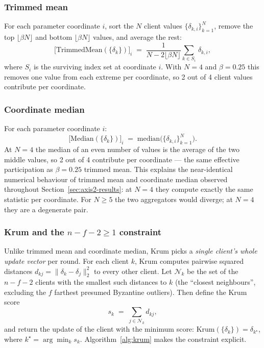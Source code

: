\documentclass[preprint,12pt,authoryear]{elsarticle}
\begin{document}
\subsubsection{Trimmed mean}
\label{subsec:trimmed}

For each parameter coordinate $i$, sort the $N$ client values
$\{\delta_{k,i}\}_{k=1}^N$, remove the top
$\lfloor \beta N \rfloor$ and bottom $\lfloor \beta N \rfloor$
values, and average the rest:
\begin{equation}
    \bigl[\mathrm{TrimmedMean}(\{\delta_k\})\bigr]_i
    \;=\; \frac{1}{N - 2\lfloor \beta N \rfloor}
    \sum_{k \in S_i}\, \delta_{k,i},
    \label{eq:trimmed}
\end{equation}
where $S_i$ is the surviving index set at coordinate $i$. With
$N = 4$ and $\beta = 0.25$ this removes one value from each extreme
per coordinate, so 2 out of 4 client values contribute per
coordinate.

\subsubsection{Coordinate median}
\label{subsec:median}

For each parameter coordinate $i$:
\begin{equation}
    \bigl[\mathrm{Median}(\{\delta_k\})\bigr]_i
    \;=\; \mathrm{median}\bigl(\{\delta_{k,i}\}_{k=1}^N\bigr).
    \label{eq:median}
\end{equation}
At $N = 4$ the median of an even number of values is the average of
the two middle values, so 2 out of 4 contribute per coordinate ---
the same effective participation as $\beta = 0.25$ trimmed mean.
This explains the near-identical numerical behaviour of trimmed
mean and coordinate median observed throughout
Section~\ref{sec:axis2-results}: at $N = 4$ they compute exactly
the same statistic per coordinate. For $N \geq 5$ the two
aggregators would diverge; at $N = 4$ they are a degenerate pair.

\subsubsection{Krum and the $n - f - 2 \geq 1$ constraint}
\label{subsec:krum}

Unlike trimmed mean and coordinate median, Krum
\citep{Blanchard2017Krum} picks a \emph{single client's whole
update vector} per round. For each client $k$, Krum computes
pairwise squared distances $d_{kj} = \| \delta_k - \delta_j \|_2^2$
to every other client. Let $\mathcal{N}_k$ be the set of the
$n - f - 2$ clients with the smallest such distances to $k$ (the
``closest neighbours'', excluding the $f$ farthest presumed
Byzantine outliers). Then define the Krum score
\begin{equation}
    s_k \;=\; \sum_{j \in \mathcal{N}_k} d_{kj},
    \label{eq:krum}
\end{equation}
and return the update of the client with the minimum score:
$\mathrm{Krum}(\{\delta_k\}) = \delta_{k^\star}$, where
$k^\star = \arg\min_k s_k$. Algorithm~\ref{alg:krum} makes the
constraint explicit.
\end{document}
